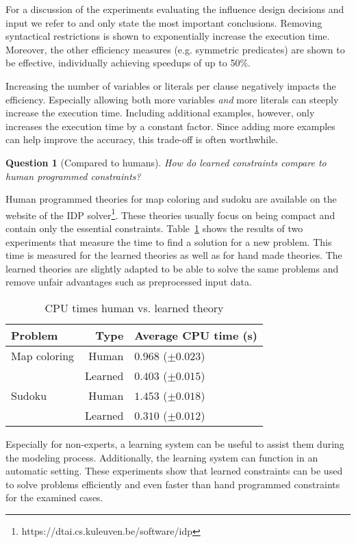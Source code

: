 \documentclass[letterpaper]{article}
\newtheorem{question}{Question}
\theoremstyle{definition}
\begin{document}
For a discussion of the experiments evaluating the influence design decisions and input we refer to \cite{kolb2015thesis} and only state the most important conclusions.
Removing syntactical restrictions is shown to exponentially increase the execution time.
Moreover, the other efficiency measures (e.g. symmetric predicates) are shown to be effective, individually achieving speedups of up to 50\%.

Increasing the number of variables or literals per clause negatively impacts the efficiency.
Especially allowing both more variables \emph{and} more literals can steeply increase the execution time.
Including additional examples, however, only increases the execution time by a constant factor.
Since adding more examples can help improve the accuracy, this trade-off is often worthwhile.

\begin{question}[Compared to humans]
  How do learned constraints compare to human programmed constraints?
\end{question}
Human programmed theories for map coloring and sudoku are available on the website of the IDP solver\footnote{https://dtai.cs.kuleuven.be/software/idp}.
These theories usually focus on being compact and contain only the essential constraints.
Table~\ref{tbl:mens} shows the results of two experiments that measure the time to find a solution for a new problem.
This time is measured for the learned theories as well as for hand made theories.
The learned theories are slightly adapted to be able to solve the same problems and remove unfair advantages such as preprocessed input data.

  \begin{table}[!htp]
    \caption{CPU times human vs. learned theory}
    \begin{tabularx}{\linewidth}{lr|X}
      \textbf{Problem} & \textbf{Type} & \textbf{Average CPU time (s)} \\
      \toprule
      Map coloring & Human & $0.968$  ($\pm 0.023$) \\
      & Learned & $0.403$       ($\pm 0.015$) \\
      \midrule
      Sudoku & Human & $1.453$    ($\pm 0.018$) \\ 
      & Learned & $0.310$       ($\pm 0.012$)
    \end{tabularx}
    \label{tbl:mens}
  \end{table}

Especially for non-experts, a learning system can be useful to assist them during the modeling process.
Additionally, the learning system can function in an automatic setting.
These experiments show that learned constraints can be used to solve problems efficiently and even faster than hand programmed constraints for the examined cases.
\end{document}
